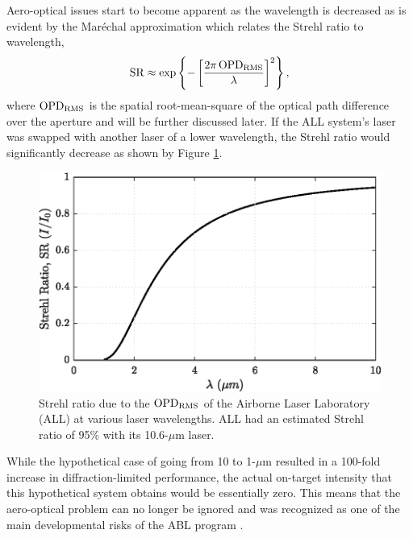 Aero-optical issues start to become apparent as the wavelength is decreased as is evident by the Mar\'echal approximation \cite{Mahajan-1983-hg7ahvJM} which relates the Strehl ratio to wavelength,
\begin{equation}
  \operatorname{SR} \approx \exp\left\{-\left[\frac{2\pi \operatorname{OPD_{RMS}}}{\lambda}\right]^2\right\} \textrm{,}
  \label{eqn:01_strehl_ratio}
\end{equation}
where $\operatorname{OPD_{RMS}}$ is the spatial root-mean-square of the optical path difference over the aperture and will be further discussed later.
If the ALL system's laser was swapped with another laser of a lower wavelength, the Strehl ratio would significantly decrease as shown by Figure \ref{fig:01_strehl_ratio}.
\begin{figure}
  \centering
  \includegraphics{../matlab/01_introduction/strehl_ratio.eps}
  \caption{Strehl ratio due to the $\operatorname{OPD_{RMS}}$ of the Airborne Laser Laboratory (ALL) at various laser wavelengths.  ALL had an estimated Strehl ratio of 95\% with its 10.6-$\mu$m laser.}
  \label{fig:01_strehl_ratio}
\end{figure}
While the hypothetical case of going from 10 to 1-$\mu$m resulted in a 100-fold increase in diffraction-limited performance, the actual on-target intensity that this hypothetical system obtains would be essentially zero.
This means that the aero-optical problem can no longer be ignored and was recognized as one of the main developmental risks of the ABL program \cite{DOTE-1999-HnkadUEw}.




